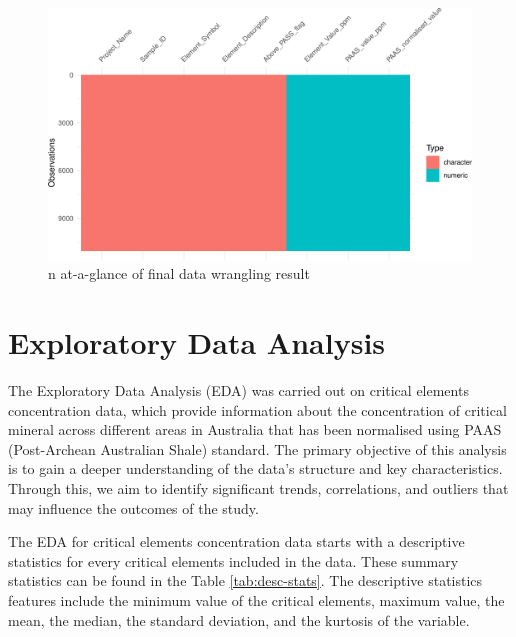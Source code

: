 \documentclass[11pt,a4paper,]{article}
\begin{document}
\begin{figure}
\centering
\includegraphics{Final_report_files/figure-latex/visdat-1.pdf}
\caption{\label{fig:visdat}n at-a-glance of final data wrangling result}
\end{figure}

\section{Exploratory Data Analysis}\label{exploratory-data-analysis}

The Exploratory Data Analysis (EDA) was carried out on critical elements concentration data, which provide information about the concentration of critical mineral across different areas in Australia that has been normalised using PAAS (Post-Archean Australian Shale) standard. The primary objective of this analysis is to gain a deeper understanding of the data's structure and key characteristics. Through this, we aim to identify significant trends, correlations, and outliers that may influence the outcomes of the study.

The EDA for critical elements concentration data starts with a descriptive statistics for every critical elements included in the data. These summary statistics can be found in the Table \ref{tab:desc-stats}. The descriptive statistics features include the minimum value of the critical elements, maximum value, the mean, the median, the standard deviation, and the kurtosis of the variable.

\begingroup\fontsize{9}{11}\selectfont
\end{document}
